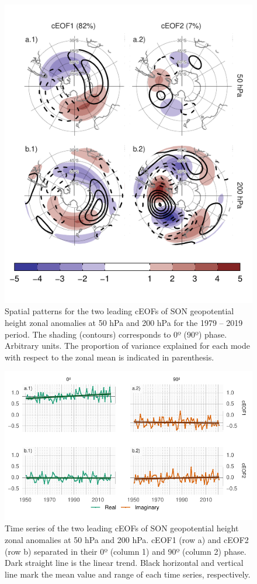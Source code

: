 \documentclass[pdflatex,sn-basic]{sn-jnl}
\theoremstyle{thmstyleone}%
\theoremstyle{thmstyletwo}%
\theoremstyle{thmstylethree}%
\begin{document}
\begin{figure}
\centering
\includegraphics{../figures/ceofs-1-1.pdf}
\caption{\label{fig:ceofs-1}Spatial patterns for the two leading cEOFs of SON geopotential height zonal anomalies at 50 hPa and 200 hPa for the 1979 -- 2019 period. The shading (contours) corresponds to 0º (90º) phase. Arbitrary units. The proportion of variance explained for each mode with respect to the zonal mean is indicated in parenthesis.}
\end{figure}



\begin{figure}
\includegraphics{../figures/extended-series-1} \caption{Time series of the two leading cEOFs of SON geopotential height zonal anomalies at 50 hPa and 200 hPa. cEOF1 (row a) and cEOF2 (row b) separated in their 0º (column 1) and 90º (column 2) phase. Dark straight line is the linear trend. Black horizontal and vertical line mark the mean value and range of each time series, respectively.}\label{fig:extended-series}
\end{figure}
\end{document}
